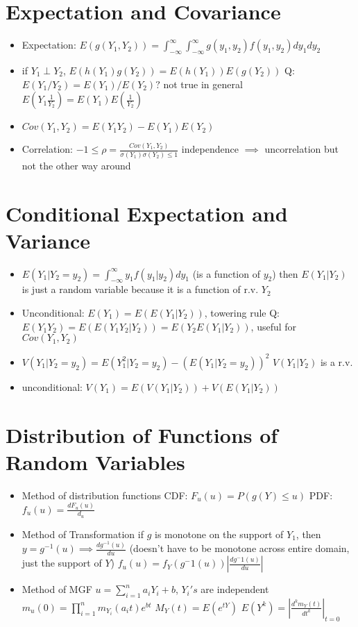 \documentclass{report}
\begin{document}
\section{Expectation and Covariance}
\begin{itemize}
	\item Expectation: $E(g(Y_1,Y_2)) = \int_{-\infty}^{\infty}\int_{-\infty}^{\infty}g(y_1,y_2)f(y_1,y_2)dy_1dy_2$
	\item if $Y_1 \perp Y_2$, $E(h(Y_1)g(Y_2)) = E(h(Y_1))E(g(Y_2))$ 
	\subitem Q: $E(Y_1/Y_2) = E(Y_1)/E(Y_2)?$ \quad not true in general
	$E(Y_1\frac{1}{Y_2}) = E(Y_1)E(\frac{1}{Y_2})$
	\item $Cov(Y_1,Y_2) = E(Y_1Y_2) - E(Y_1)E(Y_2)$
	\item Correlation: $-1 \leq \rho = \frac{Cov(Y_1,Y_2)}{\sigma(Y_1)\sigma(Y_2) \leq 1}$
	\subitem independence $\implies$ uncorrelation but not the other way around
\end{itemize}
\section{Conditional Expectation and Variance}
\begin{itemize}
	\item $E(Y_1|Y_2 = y_2) = \int_{-\infty}^{\infty}y_1f(y_1|y_2)dy_1$ (is a function of $y_2$)
	\subitem then $E(Y_1|Y_2)$ is just a random variable because it is a function of r.v. $Y_2$
	\item Unconditional: $E(Y_1) = E(E(Y_1|Y_2))$, towering rule
	\subitem Q:$E(Y_1Y_2) = E(E(Y_1Y_2|Y_2)) = E(Y_2E(Y_1|Y_2))$, useful for $Cov(Y_1,Y_2)$
	\item $V(Y_1|Y_2 = y_2) = E(Y_1^2|Y_2 = y_2) - (E(Y_1|Y_2 = y_2))^2$
	\subitem $V(Y_1|Y_2)$ is a r.v.
	\item unconditional: $V(Y_1) = E(V(Y_1|Y_2)) + V(E(Y_1|Y_2))$
\end{itemize}
\section{Distribution of Functions of Random Variables}
\begin{itemize}
	\item Method of distribution functions 
	\subitem CDF: $F_u(u) = P(g(Y) \leq u)$
	\subitem PDF: $f_u(u) = \frac{dF_u(u)}{d_u}$
	\item Method of Transformation
	\subitem if $g$ is monotone on the support of $Y_1$, then $y = g^{-1}(u) \implies \frac{dg^{-1}(u)}{du}$ (doesn't have to be monotone across entire domain, just the support of $Y$)
	\subitem $f_u(u) = f_Y(g^-1(u))|\frac{dg^-1(u)}{du}|$
	\item Method of MGF
	\subitem $u = \sum_{i=1}^{n}a_iY_i + b$, $Y_i's$ are independent
	\subitem $m_u(0) = \prod_{i=1}^{n}m_{Y_{i}}(a_{i}t)e^{bt}$
	\subitem $M_Y(t) =E(e^{tY})$
	\subitem $E(Y^k) = |\frac{d^km_Y(t)}{dt^k}|_{t=0}$
\end{itemize}
\end{document}
